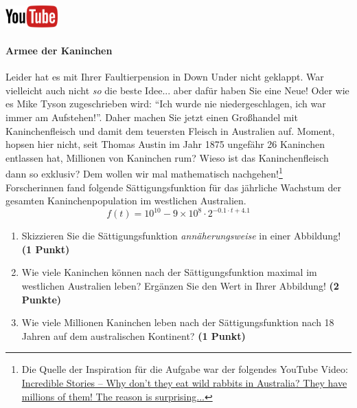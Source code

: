 \documentclass[a4paper, 9pt]{scrartcl}\usepackage[]{graphicx}\usepackage[]{xcolor}
\begin{document}
\hfill\href{https://youtu.be/Mr6eslls4J0}{\includegraphics[width =
  2cm]{img/youtube}} %
\hspace{2Ex}

\paragraph{Armee der Kaninchen}



Leider hat es mit Ihrer Faultierpension in Down Under nicht geklappt. War vielleicht
auch nicht \textit{so} die beste Idee... aber daf{\"u}r haben Sie eine Neue!
Oder wie es Mike Tyson zugeschrieben wird: "`Ich wurde nie
niedergeschlagen, ich war immer am Aufstehen!"'. Daher machen Sie jetzt
einen Gro{\ss}handel mit Kaninchenfleisch und damit dem teuersten Fleisch in
Australien auf. Moment, hopsen hier nicht, seit Thomas Austin im Jahr
1875 ungef{\"a}hr 26 Kaninchen entlassen hat,
Millionen von Kaninchen rum? Wieso ist das Kaninchenfleisch dann so
exklusiv? Dem wollen wir mal mathematisch nachgehen!\footnote{Die Quelle
  der Inspiration f{\"u}r die Aufgabe war der folgendes YouTube Video:
  \href{https://youtu.be/38fuOr3tdgc?si=Li7NL_FoByML8JtT}{ Incredible
    Stories -- Why don't they eat wild rabbits in Australia? They have
    millions of them! The reason is surprising...}}
\\

Forscherinnen fand folgende S{\"a}ttigungsfunktion f{\"u}r das j{\"a}hrliche Wachstum
der gesamten Kaninchenpopulation im westlichen Australien.
\begin{equation*}
  f(t) = \ensuremath{10^{10}} - \ensuremath{9\times 10^{8}} \cdot 2^{-0.1 \cdot t + 4.1}
\end{equation*}

\begin{enumerate}
\item Skizzieren Sie die S{\"a}ttigungsfunktion \textit{ann{\"a}herungsweise} in einer Abbildung! \textbf{(1
    Punkt)}
\item Wie viele Kaninchen k{\"o}nnen nach der S{\"a}ttigungsfunktion maximal im
  westlichen Australien leben? Erg{\"a}nzen Sie den Wert in Ihrer Abbildung! \textbf{(2 Punkte)}
\item Wie viele Millionen Kaninchen leben nach der S{\"a}ttigungsfunktion
  nach 18 Jahren auf dem australischen Kontinent? \textbf{(1
    Punkt)}
\end{enumerate}
\end{document}
